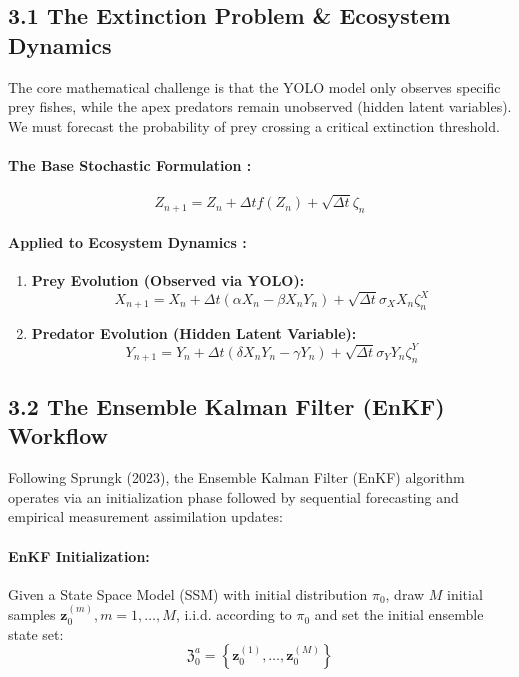 \documentclass[11pt,a4paper]{article}
\begin{document}
\subsection*{3.1 The Extinction Problem \& Ecosystem Dynamics}
The core mathematical challenge is that the YOLO model only observes specific prey fishes, while the apex predators remain unobserved (hidden latent variables). We must forecast the probability of prey crossing a critical extinction threshold.

\paragraph{The Base Stochastic Formulation \cite{sprungk2023}:}
\begin{equation}
Z_{n+1} = Z_n + \Delta t f(Z_n) + \sqrt{\Delta t} \zeta_n
\end{equation}

\paragraph{Applied to Ecosystem Dynamics \cite{sprungk2023}:}
\begin{enumerate}
    \item \textbf{Prey Evolution (Observed via YOLO):}
    \begin{equation}
    X_{n+1} = X_n + \Delta t (\alpha X_n - \beta X_n Y_n) + \sqrt{\Delta t} \sigma_X X_n \zeta_n^X
    \end{equation}
    \item \textbf{Predator Evolution (Hidden Latent Variable):}
    \begin{equation}
    Y_{n+1} = Y_n + \Delta t (\delta X_n Y_n - \gamma Y_n) + \sqrt{\Delta t} \sigma_Y Y_n \zeta_n^Y
    \end{equation}
\end{enumerate}

\subsection*{3.2 The Ensemble Kalman Filter (EnKF) Workflow \cite{sprungk2023}}
Following Sprungk (2023), the Ensemble Kalman Filter (EnKF) algorithm operates via an initialization phase followed by sequential forecasting and empirical measurement assimilation updates:

\paragraph{EnKF Initialization:}
Given a State Space Model (SSM) with initial distribution $\pi_0$, draw $M$ initial samples $\mathbf{z}_0^{(m)}, m = 1, \dots, M$, i.i.d. according to $\pi_0$ and set the initial ensemble state set:
\begin{equation}
\mathfrak{Z}_0^a = \left\{ \mathbf{z}_0^{(1)}, \dots, \mathbf{z}_0^{(M)} \right\}
\end{equation}
\end{document}

